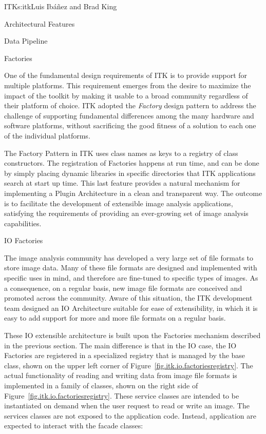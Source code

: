 \begin{aosachapter}{ITK}{s:itk}{Luis Ib\'{a}\~{n}ez and Brad King}
\begin{aosasect1}{Architectural Features}
\begin{aosasect2}{Data Pipeline}
\end{aosasect2}

\begin{aosasect2}{Factories}

One of the fundamental design requirements of ITK is to provide support for
multiple platforms. This requirement emerges from the desire to maximize the
impact of the toolkit by making it usable to a broad community regardless of
their platform of choice. ITK adopted the \emph{Factory} design pattern to
address the challenge of supporting fundamental differences among the many
hardware and software platforms, without sacrificing the good fitness of a
solution to each one of the individual platforms.

The Factory Pattern in ITK uses class names as keys to a registry of class
constructors. The registration of Factories happens at run time, and can be
done by simply placing dynamic libraries in specific directories that ITK
applications search at start up time. This last feature provides a natural
mechanism for implementing a Plugin Architecture in a clean and transparent
way. The outcome is to facilitate the development of extensible image analysis
applications, satisfying the requirements of providing an ever-growing set of
image analysis capabilities.

\end{aosasect2}

\begin{aosasect2}{IO Factories}

The image analysis community has developed a very large set of file formats to
store image data. Many of these file formats are designed and implemented with
specific uses in mind, and therefore are fine-tuned to specific types of
images. As a consequence, on a regular basis, new image file formats are
conceived and promoted across the community. Aware of this situation, the ITK
development team designed an IO Architecture suitable for ease of
extensibility, in which it is easy to add support for more and more file
formats on a regular basis.


These IO extensible architecture is built upon the Factories mechanism
described in the previous section. The main difference is that in the IO case,
the IO Factories are registered in a specialized registry that is managed by
the  base class, shown on the upper left corner of
Figure~\ref{fig.itk.io.factoriesregistry}. The actual functionality of reading
and writing data from image file formats is implemented in a family of
 classes, shown on the right side of
Figure~\ref{fig.itk.io.factoriesregistry}. These service classes are intended
to be instantiated on demand when the user request to read or write an image.
The services classes are not exposed to the application code. Instead,
application are expected to interact with the facade classes:


\end{aosasect2}
\end{aosasect1}
\end{aosachapter}
